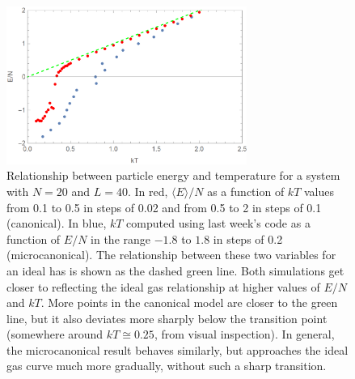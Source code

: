 \documentclass{article}
\begin{document}
\bigskip
{}
\medskip

\begin{figure}[H]
    \centering
    \includegraphics[width=0.7\textwidth]{homework9/p2.png}
    \caption{Relationship between particle energy and temperature for a system with $N=20$ and $L=40$. In red, $\langle E \rangle /N$ as a function of $kT$ values from 0.1 to 0.5 in steps of 0.02 and from 0.5 to 2 in steps of 0.1 (canonical). In blue, $kT$ computed using last week's code as a function of $E/N$ in the range $-1.8$ to $1.8$ in steps of 0.2 (microcanonical). The relationship between these two variables for an ideal has is shown as the dashed green line. Both simulations get closer to reflecting the ideal gas relationship at higher values of $E/N$ and $kT$. More points in the canonical model are closer to the green line, but it also deviates more sharply below the transition point (somewhere around $kT\cong0.25$, from visual inspection). In general, the microcanonical result behaves similarly, but approaches the ideal gas curve much more gradually, without such a sharp transition.}
    \label{fig:p2}
\end{figure}

\bigskip
{}
\medskip
\end{document}
